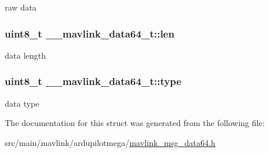 raw data 

\hypertarget{struct____mavlink__data64__t_ae4939d93f19a8337a5a333351ee88c7d}{
\subsubsection[{len}]{\setlength{\rightskip}{0pt plus 5cm}uint8\+\_\+t \+\_\+\+\_\+mavlink\+\_\+data64\+\_\+t\+::len}}\label{struct____mavlink__data64__t_ae4939d93f19a8337a5a333351ee88c7d}


data length 

\hypertarget{struct____mavlink__data64__t_aa716605f866562431612719b0c4ffa75}{
\subsubsection[{type}]{\setlength{\rightskip}{0pt plus 5cm}uint8\+\_\+t \+\_\+\+\_\+mavlink\+\_\+data64\+\_\+t\+::type}}\label{struct____mavlink__data64__t_aa716605f866562431612719b0c4ffa75}


data type 



The documentation for this struct was generated from the following file\+:\begin{DoxyCompactItemize}
\item 
src/main/mavlink/ardupilotmega/\hyperlink{mavlink__msg__data64_8h}{mavlink\+\_\+msg\+\_\+data64.\+h}\end{DoxyCompactItemize}
